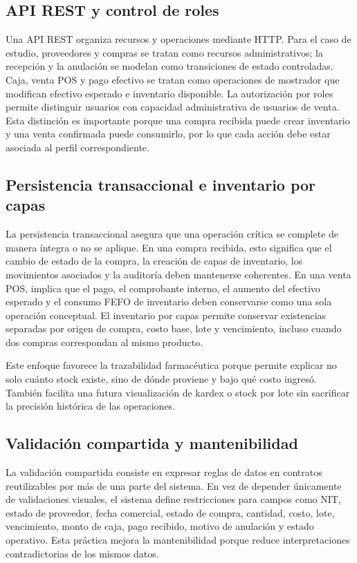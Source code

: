 \subsection{API REST y control de roles}

Una API REST organiza recursos y operaciones mediante HTTP. Para el caso de estudio, proveedores y compras se tratan como recursos administrativos; la recepción y la anulación se modelan como transiciones de estado controladas. Caja, venta POS y pago efectivo se tratan como operaciones de mostrador que modifican efectivo esperado e inventario disponible. La autorización por roles permite distinguir usuarios con capacidad administrativa de usuarios de venta. Esta distinción es importante porque una compra recibida puede crear inventario y una venta confirmada puede consumirlo, por lo que cada acción debe estar asociada al perfil correspondiente.

\subsection{Persistencia transaccional e inventario por capas}

La persistencia transaccional asegura que una operación crítica se complete de manera íntegra o no se aplique. En una compra recibida, esto significa que el cambio de estado de la compra, la creación de capas de inventario, los movimientos asociados y la auditoría deben mantenerse coherentes. En una venta POS, implica que el pago, el comprobante interno, el aumento del efectivo esperado y el consumo FEFO de inventario deben conservarse como una sola operación conceptual. El inventario por capas permite conservar existencias separadas por origen de compra, costo base, lote y vencimiento, incluso cuando dos compras correspondan al mismo producto.

Este enfoque favorece la trazabilidad farmacéutica porque permite explicar no solo cuánto stock existe, sino de dónde proviene y bajo qué costo ingresó. También facilita una futura visualización de kardex o stock por lote sin sacrificar la precisión histórica de las operaciones.

\subsection{Validación compartida y mantenibilidad}

La validación compartida consiste en expresar reglas de datos en contratos reutilizables por más de una parte del sistema. En vez de depender únicamente de validaciones visuales, el sistema define restricciones para campos como NIT, estado de proveedor, fecha comercial, estado de compra, cantidad, costo, lote, vencimiento, monto de caja, pago recibido, motivo de anulación y estado operativo. Esta práctica mejora la mantenibilidad porque reduce interpretaciones contradictorias de los mismos datos.

